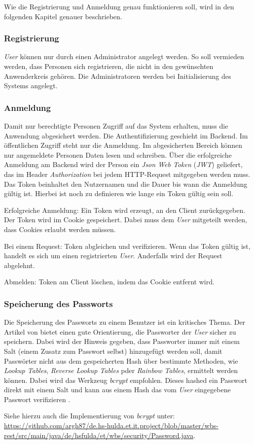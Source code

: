 Wie die Registrierung und Anmeldung genau funktionieren soll, wird in den folgenden Kapitel genauer beschrieben.

\subsubsection{Registrierung}

\textit{User} können nur durch einen Administrator angelegt werden. So soll vermieden werden, dass Personen sich registrieren, die nicht in den gewünschten Anwenderkreis gehören. Die Administratoren werden bei Initialisierung des Systems angelegt.

\subsubsection{Anmeldung}

Damit nur berechtigte Personen Zugriff auf das System erhalten, muss die Anwendung abgesichert werden. Die Authentifizierung geschieht im Backend. Im öffentlichen Zugriff steht nur die Anmeldung. Im abgesicherten Bereich können nur angemeldete Personen Daten lesen und schreiben. Über die erfolgreiche Anmeldung am Backend wird der Person ein \textit{Json Web Token} (\textit{JWT}) geliefert, das im Header \textit{Authorization} bei jedem HTTP-Request mitgegeben werden muss. Das Token beinhaltet den Nutzernamen und die Dauer bis wann die Anmeldung gültig ist. Hierbei ist noch zu definieren wie lange ein Token gültig sein soll.

Erfolgreiche Anmeldung: Ein Token wird erzeugt, an den Client zurückgegeben. Der Token wird im Cookie gespeichert. Dabei muss dem \textit{User} mitgeteilt werden, dass Cookies erlaubt werden müssen.

Bei einem Request: Token abgleichen und verifizieren. Wenn das Token gültig ist, handelt es sich um einen registrierten \textit{User}. Anderfalls wird der Request abgelehnt.

Abmelden: Token am Client löschen, indem das Cookie entfernt wird.

\subsubsection{Speicherung des Passworts}

Die Speicherung des Passworts zu einem Benutzer ist ein kritisches Thema. Der Artikel von \cite{password} bietet einen gute Orientierung, die Passworter der \textit{User} sicher zu speichern. Dabei wird \ua der Hinweis gegeben, dass Passworter immer mit einem Salt (einem Zusatz zum Passwort selbst) hinzugefügt werden soll, damit Passwörter nicht aus dem gespeicherten Hash über bestimmte Methoden, wie \zb \textit{Lookup Tables}, \textit{Reverse Lookup Tables} pder \textit{Rainbow Tables}, ermittelt werden können. Dabei wird das Werkzeug \textit{bcrypt} empfohlen. Dieses hashed ein Passwort direkt mit einem Salt und kann aus einem Hash das vom \textit{User} eingegebene Passwort verifizieren \citep[vgl.][]{password}. 

 Siehe hierzu auch die Implementierung von \textit{bcrypt} unter: \url{https://github.com/argh87/de.hs-hulda.et.it.project/blob/master/wbs-rest/src/main/java/de/hsfulda/et/wbs/security/Password.java}.

\newpage